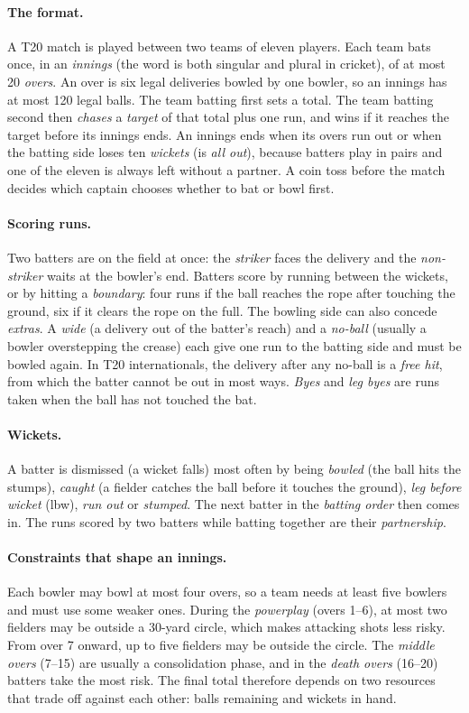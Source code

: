 \documentclass{article}
\newcommand{\1}{\mathbf{1}}
\begin{document}
\paragraph{The format.} A T20 match is played between two teams of eleven players. Each team bats once, in an \emph{innings} (the word is both singular and plural in cricket), of at most 20 \emph{overs}. An over is six legal deliveries bowled by one bowler, so an innings has at most 120 legal balls. The team batting first sets a total. The team batting second then \emph{chases} a \emph{target} of that total plus one run, and wins if it reaches the target before its innings ends. An innings ends when its overs run out or when the batting side loses ten \emph{wickets} (is \emph{all out}), because batters play in pairs and one of the eleven is always left without a partner. A coin toss before the match decides which captain chooses whether to bat or bowl first.

\paragraph{Scoring runs.} Two batters are on the field at once: the \emph{striker} faces the delivery and the \emph{non-striker} waits at the bowler's end. Batters score by running between the wickets, or by hitting a \emph{boundary}: four runs if the ball reaches the rope after touching the ground, six if it clears the rope on the full. The bowling side can also concede \emph{extras}. A \emph{wide} (a delivery out of the batter's reach) and a \emph{no-ball} (usually a bowler overstepping the crease) each give one run to the batting side and must be bowled again. In T20 internationals, the delivery after any no-ball is a \emph{free hit}, from which the batter cannot be out in most ways. \emph{Byes} and \emph{leg byes} are runs taken when the ball has not touched the bat.

\paragraph{Wickets.} A batter is dismissed (a wicket falls) most often by being \emph{bowled} (the ball hits the stumps), \emph{caught} (a fielder catches the ball before it touches the ground), \emph{leg before wicket} (lbw), \emph{run out} or \emph{stumped}. The next batter in the \emph{batting order} then comes in. The runs scored by two batters while batting together are their \emph{partnership}.

\paragraph{Constraints that shape an innings.} Each bowler may bowl at most four overs, so a team needs at least five bowlers and must use some weaker ones. During the \emph{powerplay} (overs 1--6), at most two fielders may be outside a 30-yard circle, which makes attacking shots less risky. From over 7 onward, up to five fielders may be outside the circle. The \emph{middle overs} (7--15) are usually a consolidation phase, and in the \emph{death overs} (16--20) batters take the most risk. The final total therefore depends on two resources that trade off against each other: balls remaining and wickets in hand.
\end{document}
